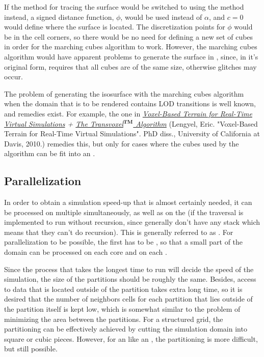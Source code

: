If the \VOF method for tracing the surface would be switched to using the \LS method instead, a signed distance function, $\phi$, would be used instead of $\alpha$, and $c = 0$ would define where the surface is located. The discretization points for $\phi$ would be in the cell corners, so there would be no need for defining a new set of cubes in order for the marching cubes algorithm to work. However, the marching cubes algorithm would have apparent problems to generate the surface in , since, in it's original form, requires that all cubes are of the same size, otherwise glitches may occur.

The problem of generating the isosurface with the marching cubes algorithm when the domain that is to be rendered contains LOD transitions is well known, and remedies exist. For example, the one in \textit{\href{http://www.terathon.com/lengyel/Lengyel-VoxelTerrain.pdf}{Voxel-Based Terrain for Real-Time Virtual Simulations} + \href{http://www.terathon.com/voxels/}{The Transvoxel$^{\textbf{TM}}$ Algorithm}} (Lengyel, Eric. "Voxel-Based Terrain for Real-Time Virtual Simulations". PhD diss., University of California at Davis, 2010.) \citep{temp} remedies this, but only for cases where the cubes used by the algorithm can be fit into an \octree.

\subsection{Parallelization}

In order to obtain a simulation speed-up that is almost certainly needed, it can be processed on multiple \CPUs simultaneously, as well as on the \GPU (if the \octree traversal is implemented to run without recursion, since \GPUs generally don't have any stack which means that they can't do recursion). This is generally referred to as \parallelization. For parallelization to be possible, the  first has to be \partitioned, so that a small part of the domain can be processed on each core and on each .

Since the process that takes the longest time to run will decide the speed of the simulation, the size of the partitions should be roughly the same. Besides, access to data that is located outside of the partition takes extra long time, so it is desired that the number of neighbors cells for each partition that lies outside of the partition itself is kept low, which is somewhat similar to the problem of minimizing the area between the partitions. For a structured grid, the partitioning can be effectively achieved by cutting the simulation domain into square or cubic pieces. However, for an  like an \octree, the partitioning is more difficult, but still possible.

